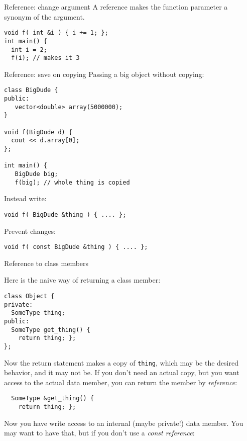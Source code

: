 \begin{block}{Reference: change argument}
\label{sl:refarg-change}
A reference makes the function parameter a synonym of the argument.
\begin{lstlisting}
void f( int &i ) { i += 1; };
int main() {
  int i = 2;
  f(i); // makes it 3
\end{lstlisting}
\end{block}

\begin{block}{Reference: save on copying}
Passing a big object without copying:
\label{sl:refarg-nocopy}
\begin{multicols}{2}
\begin{lstlisting}
class BigDude {
public:
   vector<double> array(5000000);
}

void f(BigDude d) {
  cout << d.array[0];
};

int main() {
   BigDude big;
   f(big); // whole thing is copied
\end{lstlisting}
\columnbreak
Instead write:
\begin{lstlisting}
void f( BigDude &thing ) { .... };
\end{lstlisting}
Prevent changes:
\begin{lstlisting}
void f( const BigDude &thing ) { .... };
\end{lstlisting}
\hbox{}\vfill\hbox{}
\end{multicols}
\end{block}

 {Reference to class members}
\label{sec:class-ref}

Here is the naive way of returning a class member:
\begin{lstlisting}
class Object {
private:
  SomeType thing;
public:
  SomeType get_thing() {
    return thing; };
};
\end{lstlisting}
Now the return statement makes a copy of \lstinline{thing},
which may be the desired behavior, and it may not be.
If you don't need an actual copy,
but you want access to the actual data member,
you can return the member by
\emph{reference}:
\begin{lstlisting}
  SomeType &get_thing() { 
    return thing; };
\end{lstlisting}
Now you have write access to an internal (maybe private!) data member.
You may want to have that, but if you don't
use a
\emph{const reference}:
%

